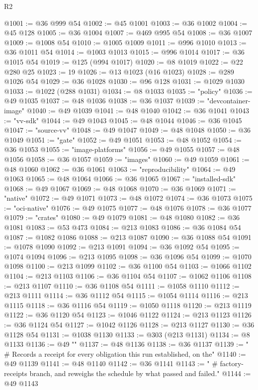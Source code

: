 \begin{lexlean}{R2}
\begin{coremodule}
@1001 := @36 @999 @54
@1002 := @45 @1001
@1003 := @36 @1002
@1004 := @45 @128
@1005 := @36 @1004
@1007 := @469 @995 @54
@1008 := @36 @1007
@1009 := @1008 @54
@1010 := @1005 @1009
@1011 := @996 @1010
@1013 := @36 @1011 @54
@1014 := @1003 @1013
@1015 := @996 @1014
@1017 := @36 @1015 @54
@1019 := @125 (@994 @1017)
@1020 := @8 @1019
@1022 := @22 @280 @25
@1023 := 19
@1026 := @13 @1023 (@16 @1023)
@1028 := @289 @1026 @54
@1029 := @36 @1028
@1030 := @96 @128
@1031 := @1029 @1030
@1033 := @1022 (@288 @1031)
@1034 := @8 @1033
@1035 := "policy"
@1036 := @49 @1035
@1037 := @48 @1036
@1038 := @36 @1037
@1039 := "devcontainer-image"
@1040 := @49 @1039
@1041 := @48 @1040
@1042 := @36 @1041
@1043 := "vv-sdk"
@1044 := @49 @1043
@1045 := @48 @1044
@1046 := @36 @1045
@1047 := "source-vv"
@1048 := @49 @1047
@1049 := @48 @1048
@1050 := @36 @1049
@1051 := "gate"
@1052 := @49 @1051
@1053 := @48 @1052
@1054 := @36 @1053
@1055 := "image-platforms"
@1056 := @49 @1055
@1057 := @48 @1056
@1058 := @36 @1057
@1059 := "images"
@1060 := @49 @1059
@1061 := @48 @1060
@1062 := @36 @1061
@1063 := "reproducibility"
@1064 := @49 @1063
@1065 := @48 @1064
@1066 := @36 @1065
@1067 := "installed-sdk"
@1068 := @49 @1067
@1069 := @48 @1068
@1070 := @36 @1069
@1071 := "native"
@1072 := @49 @1071
@1073 := @48 @1072
@1074 := @36 @1073
@1075 := "oci-native"
@1076 := @49 @1075
@1077 := @48 @1076
@1078 := @36 @1077
@1079 := "crates"
@1080 := @49 @1079
@1081 := @48 @1080
@1082 := @36 @1081
@1083 := @53 @473
@1084 := @213 @1083
@1086 := @36 @1084 @54
@1087 := @1082 @1086
@1088 := @213 @1087
@1090 := @36 @1088 @54
@1091 := @1078 @1090
@1092 := @213 @1091
@1094 := @36 @1092 @54
@1095 := @1074 @1094
@1096 := @213 @1095
@1098 := @36 @1096 @54
@1099 := @1070 @1098
@1100 := @213 @1099
@1102 := @36 @1100 @54
@1103 := @1066 @1102
@1104 := @213 @1103
@1106 := @36 @1104 @54
@1107 := @1062 @1106
@1108 := @213 @1107
@1110 := @36 @1108 @54
@1111 := @1058 @1110
@1112 := @213 @1111
@1114 := @36 @1112 @54
@1115 := @1054 @1114
@1116 := @213 @1115
@1118 := @36 @1116 @54
@1119 := @1050 @1118
@1120 := @213 @1119
@1122 := @36 @1120 @54
@1123 := @1046 @1122
@1124 := @213 @1123
@1126 := @36 @1124 @54
@1127 := @1042 @1126
@1128 := @213 @1127
@1130 := @36 @1128 @54
@1131 := @1038 @1130
@1133 := @303 (@213 @1131)
@1134 := @8 @1133
@1136 := @49 ""
@1137 := @48 @1136
@1138 := @36 @1137
@1139 := "  # Records a receipt for every obligation this run established, on the"
@1140 := @49 @1139
@1141 := @48 @1140
@1142 := @36 @1141
@1143 := "  # factory-receipts branch, and reweighs the schedule by what passed and failed."
@1144 := @49 @1143

\end{coremodule}
\end{lexlean}
